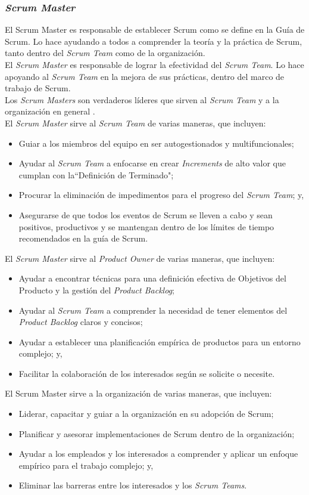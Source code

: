 \begin{spacing}{1.5}
		\subsubsection{\textit{Scrum Master}}
			El Scrum Master es responsable de establecer Scrum como se define en la Guía de Scrum. Lo hace ayudando a todos a comprender la teoría y la práctica de Scrum, tanto dentro del \textit{Scrum Team} como de la organización.\\
			El \textit{Scrum Master} es responsable de lograr la efectividad del \textit{Scrum Team}. Lo hace apoyando al \textit{Scrum Team} en la mejora de sus prácticas, dentro del marco de trabajo de Scrum.\\
			Los \textit{Scrum Masters} son verdaderos líderes que sirven al \textit{Scrum Team} y a la organización en general \cite{chap2_scrum}.\\
			El \textit{Scrum Master} sirve al \textit{Scrum Team} de varias maneras, que incluyen:
			\begin{itemize}
				\item Guiar a los miembros del equipo en ser autogestionados y multifuncionales;
				\item Ayudar al \textit{Scrum Team} a enfocarse en crear \textit{Increments} de alto valor que cumplan con la``Definición de Terminado";
				\item Procurar la eliminación de impedimentos para el progreso del \textit{Scrum Team}; y,
				\item Asegurarse de que todos los eventos de Scrum se lleven a cabo y sean positivos, productivos y se mantengan dentro de los límites de tiempo recomendados en la gu\'{i}a de Scrum.
			\end{itemize}
			El \textit{Scrum Master} sirve al \textit{Product Owner} de varias maneras, que incluyen:
			\begin{itemize}
				\item Ayudar a encontrar técnicas para una definición efectiva de Objetivos del Producto y la gestión	del \textit{Product Backlog};
				\item Ayudar al \textit{Scrum Team} a comprender la necesidad de tener elementos del \textit{Product Backlog} claros y concisos;
				\item Ayudar a establecer una planificación empírica de productos para un entorno complejo; y,
				\item Facilitar la colaboración de los interesados según se solicite o necesite.
			\end{itemize}
			El Scrum Master sirve a la organización de varias maneras, que incluyen:
			\begin{itemize}
			\item Liderar, capacitar y guiar a la organización en su adopción de Scrum;
			\item Planificar y asesorar implementaciones de Scrum dentro de la organización;
			\item Ayudar a los empleados y los interesados a comprender y aplicar un enfoque empírico para el trabajo complejo; y,
			\item Eliminar las barreras entre los interesados y los \textit{Scrum Teams}.
			\end{itemize}

\end{spacing}
